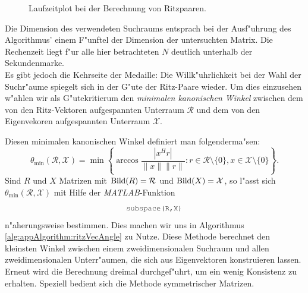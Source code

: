 \begin{figure}[h!]
\centering


\caption{Laufzeitplot bei der Berechnung von Ritzpaaren.}\label{fig:chap5:laufzeitRayleighRitz}
\end{figure}

Die Dimension des verwendeten Suchraums entsprach bei der Ausf"uhrung des Algorithmus' einem F"unftel der Dimension der untersuchten Matrix. Die Rechenzeit liegt f"ur alle hier betrachteten $N$ deutlich unterhalb der Sekundenmarke.\\

Es gibt jedoch die Kehrseite der Medaille: Die Willk"uhrlichkeit bei der Wahl der Suchr"aume spiegelt sich in der G"ute der Ritz-Paare wieder. Um dies einzusehen w"ahlen wir als G"utekritierum den \emph{minimalen kanonischen Winkel} zwischen dem von den Ritz-Vektoren aufgespannten Unterraum $\mathcal{R}$ und dem von den Eigenvekoren aufgespannten Unterraum $\mathcal{X}$.

\newpage

Diesen minimalen kanonischen Winkel definiert man folgenderma"sen:
\[
\theta_{\min}(\mathcal{R},\mathcal{X}) =
\min
\left\{\arccos\frac{|x^H r|}{\|x\|\|r\|} : r\in\mathcal{R}\setminus\{0\}, x\in\mathcal{X}\setminus\{0\}\right\}.
\]
Sind $R$ und $X$ Matrizen mit $\operatorname{Bild}(R)=\mathcal{R}$ und $\operatorname{Bild}(X)=\mathcal{X}$, so l"asst sich $\theta_{\min}(\mathcal{R},\mathcal{X})$ mit Hilfe der \emph{MATLAB}-Funktion
\[
\mcode{subspace(R,X)}
\]
n"aherungsweise bestimmen. Dies machen wir uns in Algorithmus \ref{alg:appAlgorithm:ritzVecAngle} zu Nutze.
Diese Methode berechnet den kleinsten Winkel zwischen einem zweidimensionalen Suchraum und allen zweidimensionalen Unterr"aumen, die sich aus Eigenvektoren konstruieren lassen. Erneut wird die Berechnung dreimal durchgef"uhrt, um ein wenig Konsistenz zu erhalten. Speziell bedient sich die Methode symmetrischer Matrizen.

